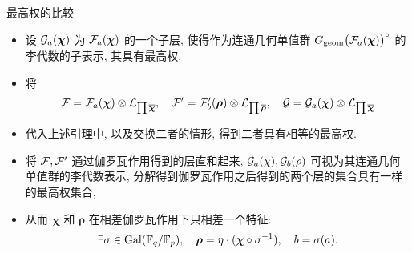 \documentclass[aspectratio=169,handout]{ctexbeamer}
\newcommand\bchi{{\boldsymbol\chi}}
\newcommand\brho{{\boldsymbol\rho}}
\begin{document}
\begin{frame}{最高权的比较}
	\begin{itemize}
		\item 设 $\CG_a(\bchi)$ 为 $\CF_a(\bchi)$ 的一个子层, 使得作为连通几何单值群 $G_\geom\bigl(\CF_a(\bchi)\bigr)^\circ$ 的李代数的子表示, 其具有最高权.
		\item 将
		\[
			\CF=\CF_a(\bchi)\otimes\CL_{\prod\ov \bchi},\quad
			\CF'=\CF'_b(\brho)\otimes\CL_{\prod\ov \brho},\quad
			\CG=\CG_a(\bchi)\otimes\CL_{\prod\ov \bchi}
		\]
		\item 代入上述引理中, 以及交换二者的情形, 得到二者具有相等的最高权.
		\item 将 ${\mathcal{F}},{\mathcal{F}}'$ 通过伽罗瓦作用得到的层直和起来, ${\mathcal{G}}_a(\chi),{\mathcal{G}}_b(\rho)$ 可视为其连通几何单值群的李代数表示, 分解得到伽罗瓦作用之后得到的两个层的集合具有一样的最高权集合,
		\item 从而 $\bchi$ 和 $\brho$ 在相差伽罗瓦作用下只相差一个特征:
		\[
			\exists\sigma\in\Gal(\BF_q/\BF_p),\quad
			\brho=\eta\cdot(\bchi\circ \sigma^{-1}),\quad
			b=\sigma(a).
		\]
	\end{itemize}
\end{frame}







\end{document}

